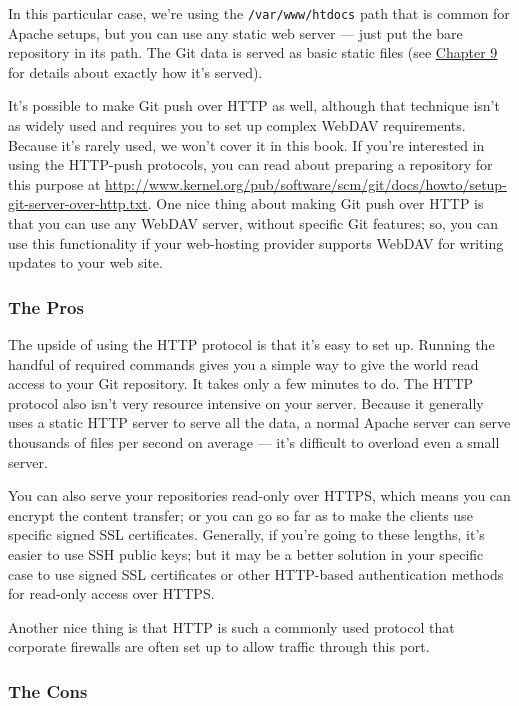 \documentclass[a4paper]{book}
\newcommand{\prechap}{Chapter }
\newcommand{\postchap}{}
\newcommand{\chapref}[1]{\hyperref[chap:#1]{\prechap #1\postchap}}
\begin{document}
In this particular case, we're using the \texttt{/var/www/htdocs} path that is common for Apache setups, but you can use any static web server --- just put the bare repository in its path. The Git data is served as basic static files (see \chapref{9} for details about exactly how it's served).

It's possible to make Git push over HTTP as well, although that technique isn't as widely used and requires you to set up complex WebDAV requirements. Because it's rarely used, we won't cover it in this book. If you're interested in using the HTTP-push protocols, you can read about preparing a repository for this purpose at \url{http://www.kernel.org/pub/software/scm/git/docs/howto/setup-git-server-over-http.txt}. One nice thing about making Git push over HTTP is that you can use any WebDAV server, without specific Git features; so, you can use this functionality if your web-hosting provider supports WebDAV for writing updates to your web site.

\subsubsection{The Pros}

The upside of using the HTTP protocol is that it's easy to set up. Running the handful of required commands gives you a simple way to give the world read access to your Git repository. It takes only a few minutes to do. The HTTP protocol also isn't very resource intensive on your server. Because it generally uses a static HTTP server to serve all the data, a normal Apache server can serve thousands of files per second on average --- it's difficult to overload even a small server.

You can also serve your repositories read-only over HTTPS, which means you can encrypt the content transfer; or you can go so far as to make the clients use specific signed SSL certificates. Generally, if you're going to these lengths, it's easier to use SSH public keys; but it may be a better solution in your specific case to use signed SSL certificates or other HTTP-based authentication methods for read-only access over HTTPS.

Another nice thing is that HTTP is such a commonly used protocol that corporate firewalls are often set up to allow traffic through this port.

\subsubsection{The Cons}
\end{document}
